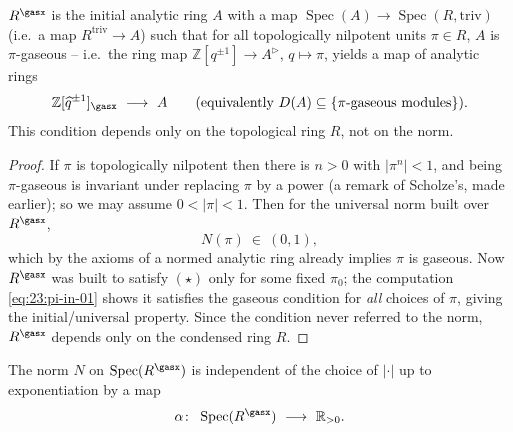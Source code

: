 \begin{proposition}
\label{prop:23:intrinsic}
$R^\gasx$ is the initial analytic ring $A$ with a map
$\operatorname{Spec}(A)\to\operatorname{Spec}(R,\mathrm{triv})$ (i.e.\ a map
$R^{\mathrm{triv}}\to A$) such that for all topologically nilpotent units
$\pi\in R$, $A$ is $\pi$-gaseous -- i.e.\ the ring map
$\mathbb Z[q^{\pm1}]\to A^\triangleright$, $q\mapsto\pi$, yields a map of
analytic rings
\begin{equation*}
\mathbb Z[\widehat q^{\pm1}]_\gasx\ \longrightarrow\ A
\qquad(\text{equivalently } D(A)\subseteq\{\pi\text{-gaseous modules}\}).
\end{equation*}
This condition depends only on the topological ring $R$, not on the norm.
\end{proposition}

\begin{proof}
If $\pi$ is topologically nilpotent then there is $n>0$ with
$\lvert\pi^n\rvert<1$, and being $\pi$-gaseous is invariant under replacing $\pi$
by a power (a remark of Scholze's, made earlier); so we may assume
$0<\lvert\pi\rvert<1$. Then for the universal norm built over $R^\gasx$,
\begin{equation}
\label{eq:23:pi-in-01}
N(\pi)\ \in\ (0,1),
\end{equation}
which by the axioms of a normed analytic ring already implies $\pi$ is gaseous.
Now $R^\gasx$ was built to satisfy $(\star)$ only for some fixed $\pi_0$; the
computation \eqref{eq:23:pi-in-01} shows it satisfies the gaseous condition for
\emph{all} choices of $\pi$, giving the initial/universal property. Since the
condition never referred to the norm, $R^\gasx$ depends only on the condensed
ring $R$.
\end{proof}

\begin{proposition}
\label{prop:23:norm-rescaling}
The norm $N$ on $\operatorname{Spec}(R^\gasx)$ is independent of the choice of
$\lvert\cdot\rvert$ up to exponentiation by a map
\begin{equation*}
\alpha\colon\ \operatorname{Spec}(R^\gasx)\ \longrightarrow\ \mathbb R_{>0}.
\end{equation*}
\end{proposition}

